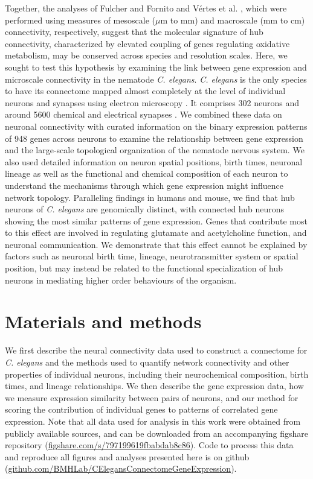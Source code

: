 \documentclass[10pt,letterpaper]{article}
\begin{document}
Together, the analyses of Fulcher and Fornito \cite{Fulcher:2016ck} and V\'ertes et al. \cite{Vertes2016a}, which were performed using measures of mesoscale ($\mu$m to mm) and macroscale (mm to cm) connectivity, respectively, suggest that the molecular signature of hub connectivity, characterized by elevated coupling of genes regulating oxidative metabolism, may be conserved across species and resolution scales.
Here, we sought to test this hypothesis by examining the link between gene expression and microscale connectivity in the nematode \emph{C. elegans}.
\emph{C. elegans} is the only species to have its connectome mapped almost completely at the level of individual neurons and synapses using electron microscopy \cite{White:1986tx, Varshney2011}.
It comprises 302 neurons and around 5600 chemical and electrical synapses \cite{White:1986tx}.
We combined these data on neuronal connectivity with curated information on the binary expression patterns of 948 genes across neurons to examine the relationship between gene expression and the large-scale topological organization of the nematode nervous system.
We also used detailed information on neuron spatial positions, birth times, neuronal lineage as well as the functional and chemical composition of each neuron to understand the mechanisms through which gene expression might influence network topology.
Paralleling findings in humans and mouse, we find that hub neurons of \emph{C. elegans} are genomically distinct, with connected hub neurons showing the most similar patterns of gene expression.
Genes that contribute most to this effect are involved in regulating glutamate and acetylcholine function, and neuronal communication.
We demonstrate that this effect cannot be explained by factors such as neuronal birth time, lineage, neurotransmitter system or spatial position, but may instead be related to the functional specialization of hub neurons in mediating higher order behaviours of the organism.

\section*{Materials and methods}

We first describe the neural connectivity data used to construct a connectome for \textit{C. elegans} and the methods used to quantify network connectivity and other properties of individual neurons, including their neurochemical composition, birth times, and lineage relationships.
We then describe the gene expression data, how we measure expression similarity between pairs of neurons, and our method for scoring the contribution of individual genes to patterns of correlated gene expression.
Note that all data used for analysis in this work were obtained from publicly available sources, and can be downloaded from an accompanying figshare repository (\url{figshare.com/s/797199619fbabdab8c86}).
Code to process this data and reproduce all figures and analyses presented here is on github (\url{github.com/BMHLab/CElegansConnectomeGeneExpression}).
\end{document}
